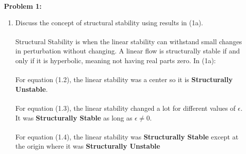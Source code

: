 \documentclass[11pt]{article}
\newcommand{\skipline}{\vspace{\baselineskip}}
\newenvironment{problem}[1]{\textbf{Problem #1: }}{\newpage}
\begin{document}
\begin{problem}{1}
\begin{enumerate}[label = (\alph*)]
\begin{itemize}
\[\begin{array}{cc}
				\end{array}\right]\]
				Notice the Jacobians and eigenvalues evaluated at the critical points:
				\[J(0,0) = \begin{bmatrix}
					0 & 1 \\ -1 & 0
				\end{bmatrix}\] 
				From solving $|A - \lambda I| = 0$, we get that $\lambda = \pm i$.  Thus we get a \textbf{Clockwise Center}.
				\[J(\pm \sqrt{6}, 0) = \begin{bmatrix}
					0 & 1 \\ 2 & 0
				\end{bmatrix}\]
				From solving $|A - \lambda I| = 0$, we get that $\lambda = \pm \sqrt{2}$.  Thus we get a \textbf{Saddle Point}.
			\end{itemize}
			\skipline
			\item  Discuss the concept of structural stability using results in (1a).
			\\ \\
			Structural Stability is when the linear stability can withstand small changes in perturbation without changing. A linear flow is structurally stable if and only if it is hyperbolic, meaning not having real parts zero.  In (1a): 
			\\ \\
			For equation (1.2), the linear stability was a center so it is \textbf{Structurally Unstable}.  
			\\ \\
			For equation (1.3), the linear stability changed a lot for different values of $\epsilon$.  It was \textbf{Structurally Stable} as long as $\epsilon \not  = 0$.  
			\\ \\
			For equation (1.4), the linear stability was \textbf{Structurally Stable} except at the origin where it was \textbf{Structurally Unstable}
		\end{enumerate}
	\end{problem}
\end{document}
